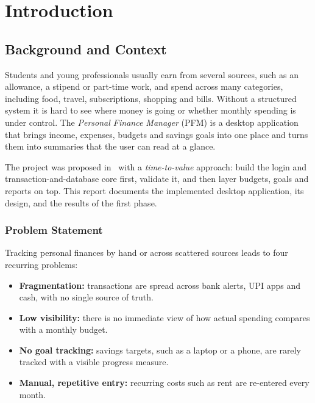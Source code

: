 \documentclass{tietreport}
\author{%
  \texttt{1024030022} Arjun Puri \\
  \texttt{1024030105} Anshdeep Singh%
}
\begin{document}
\let\cleardoublepage\clearpage

\maketitle

\tableofcontents
\listoffigures
\listoftables


\chapter{Introduction}

\section{Background and Context}

Students and young professionals usually earn from several
sources, such as an allowance, a stipend or part-time work, and
spend across many categories, including food, travel,
subscriptions, shopping and bills. Without a structured system it
is hard to see where money is going or whether monthly spending is
under control. The \emph{Personal Finance Manager} (PFM) is a
desktop application that brings income, expenses, budgets and
savings goals into one place and turns them into summaries that
the user can read at a glance.

The project was proposed in~\cite{pfmproposal} with a
\emph{time-to-value} approach: build the login and
transaction-and-database core first, validate it, and then layer
budgets, goals and reports on top. This report documents the
implemented desktop application, its design, and the results of
the first phase.

\subsection{Problem Statement}

Tracking personal finances by hand or across scattered sources
leads to four recurring problems:

\begin{itemize}
  \item \textbf{Fragmentation:} transactions are spread across
    bank alerts, UPI apps and cash, with no single source of truth.
  \item \textbf{Low visibility:} there is no immediate view of how
    actual spending compares with a monthly budget.
  \item \textbf{No goal tracking:} savings targets, such as a
    laptop or a phone, are rarely tracked with a visible progress
    measure.
  \item \textbf{Manual, repetitive entry:} recurring costs such as
    rent are re-entered every month.
\end{itemize}
\end{document}
